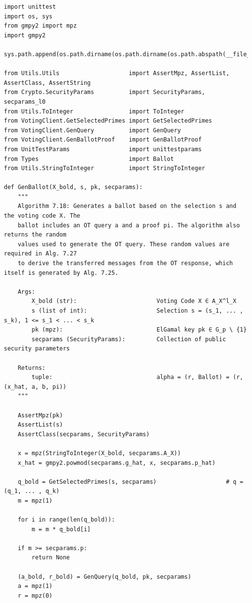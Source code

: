 \documentclass[a4paper,12pt]{report}
\begin{document}
\begin{verbatim}
import unittest
import os, sys
from gmpy2 import mpz
import gmpy2

sys.path.append(os.path.dirname(os.path.dirname(os.path.abspath(__file__))))

from Utils.Utils                    import AssertMpz, AssertList, AssertClass, AssertString
from Crypto.SecurityParams          import SecurityParams, secparams_l0
from Utils.ToInteger                import ToInteger
from VotingClient.GetSelectedPrimes import GetSelectedPrimes
from VotingClient.GenQuery          import GenQuery
from VotingClient.GenBallotProof    import GenBallotProof
from UnitTestParams                 import unittestparams
from Types                          import Ballot
from Utils.StringToInteger          import StringToInteger

def GenBallot(X_bold, s, pk, secparams):
    """
    Algorithm 7.18: Generates a ballot based on the selection s and the voting code X. The
    ballot includes an OT query a and a proof pi. The algorithm also returns the random
    values used to generate the OT query. These random values are required in Alg. 7.27
    to derive the transferred messages from the OT response, which itself is generated by Alg. 7.25.

    Args:
        X_bold (str):                       Voting Code X ∈ A_X^l_X
        s (list of int):                    Selection s = (s_1, ... , s_k), 1 <= s_1 < ... < s_k
        pk (mpz):                           ElGamal key pk ∈ G_p \ {1}
        secparams (SecurityParams):         Collection of public security parameters

    Returns:
        tuple:                              alpha = (r, Ballot) = (r, (x_hat, a, b, pi))
    """

    AssertMpz(pk)
    AssertList(s)
    AssertClass(secparams, SecurityParams)

    x = mpz(StringToInteger(X_bold, secparams.A_X))
    x_hat = gmpy2.powmod(secparams.g_hat, x, secparams.p_hat)

    q_bold = GetSelectedPrimes(s, secparams)                    # q = (q_1, ... , q_k)
    m = mpz(1)

    for i in range(len(q_bold)):
        m = m * q_bold[i]

    if m >= secparams.p:
        return None

    (a_bold, r_bold) = GenQuery(q_bold, pk, secparams)
    a = mpz(1)
    r = mpz(0)


\end{verbatim}
\end{document}
